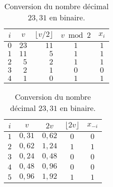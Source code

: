 \documentclass[11pt,article]{memoir}
\begin{document}
\begin{table}
  \caption{Conversion du nombre décimal $23,31$ en binaire.}
  \begin{minipage}[t]{0.45\linewidth}
    \begin{tabular*}{\linewidth}{crrcc}
      \toprule
      $i$ & \multicolumn{1}{c}{$v$} & $\lfloor v/2 \rfloor$ & $v \bmod 2$ & $x_i$ \\
      \midrule
      $0$ & $23$ & $11$ & $1$ & $1$ \\
      $1$ & $11$ &  $5$ & $1$ & $1$ \\
      $2$ &  $5$ &  $2$ & $1$ & $1$ \\
      $3$ &  $2$ &  $1$ & $0$ & $0$ \\
      $4$ &  $1$ &  $0$ & $1$ & $1$ \\
      \bottomrule
    \end{tabular*}
  \end{minipage}
  \hfill
  \begin{minipage}[t]{0.45\linewidth}
    \begin{tabular*}{\linewidth}{ccccc}
      \toprule
      $i$ & $v$ & $2v$ & $\lfloor 2v \rfloor$ & $x_{-i}$ \\
      \midrule
      $1$ & $0,31$ & $0,62$ & $0$ & $0$ \\
      $2$ & $0,62$ & $1,24$ & $1$ & $1$ \\
      $3$ & $0,24$ & $0,48$ & $0$ & $0$ \\
      $4$ & $0,48$ & $0,96$ & $0$ & $0$ \\
      $5$ & $0,96$ & $1,92$ & $1$ & $1$ \\
      \bottomrule
    \end{tabular*}
  \end{minipage}
\end{table}
\end{document}
